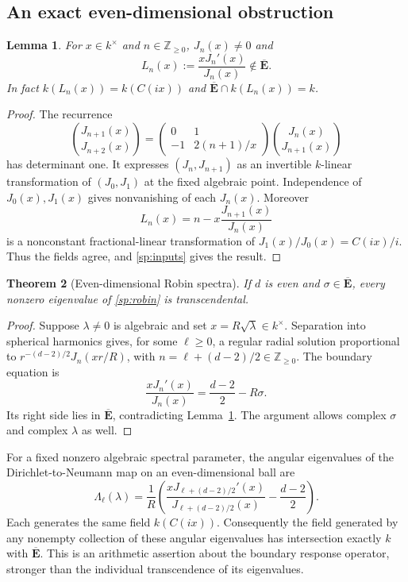 \documentclass[11pt]{article}
\newtheorem{theorem}{Theorem}[section]
\newtheorem{lemma}[theorem]{Lemma}
\theoremstyle{definition}
\theoremstyle{remark}
\begin{document}
\subsection{An exact even-dimensional obstruction}

\begin{lemma}\label{sp:integer-ratio}
For $x\in k^\times$ and $n\in\mathbb Z_{\ge0}$, $J_n(x)\ne0$ and
\[
 L_n(x):=\frac{xJ_n'(x)}{J_n(x)}\notin\overline{\mathbf E}.
\]
In fact $k(L_n(x))=k(C(ix))$ and
$\overline{\mathbf E}\cap k(L_n(x))=k$.
\end{lemma}
\begin{proof}
The recurrence
\[
 \binom{J_{n+1}(x)}{J_{n+2}(x)}
 =\begin{pmatrix}0&1\\-1&2(n+1)/x\end{pmatrix}
       \binom{J_n(x)}{J_{n+1}(x)}
\]
has determinant one.  It expresses $(J_n,J_{n+1})$ as an invertible
$k$-linear transformation of $(J_0,J_1)$ at the fixed algebraic point.
Independence of $J_0(x),J_1(x)$ gives nonvanishing of each $J_n(x)$.
Moreover
\[
 L_n(x)=n-x\frac{J_{n+1}(x)}{J_n(x)}
\]
is a nonconstant fractional-linear transformation of
$J_1(x)/J_0(x)=C(ix)/i$.  Thus the fields agree, and
\eqref{sp:inputs} gives the result.
\end{proof}

\begin{theorem}[Even-dimensional Robin spectra]\label{sp:even}
If $d$ is even and $\sigma\in\overline{\mathbf E}$, every nonzero
eigenvalue of \eqref{sp:robin} is transcendental.
\end{theorem}
\begin{proof}
Suppose $\lambda\ne0$ is algebraic and set $x=R\sqrt\lambda\in k^\times$.
Separation into spherical harmonics gives, for some $\ell\ge0$, a regular
radial solution proportional to
$r^{-(d-2)/2}J_n(xr/R)$, with $n=\ell+(d-2)/2\in\mathbb Z_{\ge0}$.
The boundary equation is
\[
 \frac{xJ_n'(x)}{J_n(x)}=\frac{d-2}{2}-R\sigma.
\]
Its right side lies in $\overline{\mathbf E}$, contradicting
Lemma~\ref{sp:integer-ratio}.  The argument allows complex $\sigma$ and
complex $\lambda$ as well.
\end{proof}

For a fixed nonzero algebraic spectral parameter, the angular
eigenvalues of the Dirichlet-to-Neumann map on an even-dimensional ball
are
\[
 \Lambda_\ell(\lambda)=\frac1R
 \left(\frac{xJ_{\ell+(d-2)/2}'(x)}
 {J_{\ell+(d-2)/2}(x)}-\frac{d-2}{2}\right).
\]
Each generates the same field $k(C(ix))$.  Consequently the field
generated by any nonempty collection of these angular eigenvalues has
intersection exactly $k$ with $\overline{\mathbf E}$.  This is an
arithmetic assertion about the boundary response operator, stronger
than the individual transcendence of its eigenvalues.
\end{document}
